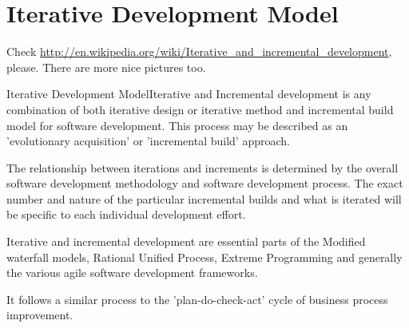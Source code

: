 \section{Iterative Development Model}
\label{sec:Iterative Development Model}

Check \url{http://en.wikipedia.org/wiki/Iterative_and_incremental_development}, please. There are more nice pictures too.

Iterative Development ModelIterative and Incremental development is any combination of both iterative design or iterative method and incremental build model for software development. This process may be described as an 'evolutionary acquisition' or 'incremental build' approach.

The relationship between iterations and increments is determined by the overall software development methodology and software development process. The exact number and nature of the particular incremental builds and what is iterated will be specific to each individual development effort.

Iterative and incremental development are essential parts of the Modified waterfall models, Rational Unified Process, Extreme Programming and generally the various agile software development frameworks.

It follows a similar process to the 'plan-do-check-act' cycle of business process improvement.